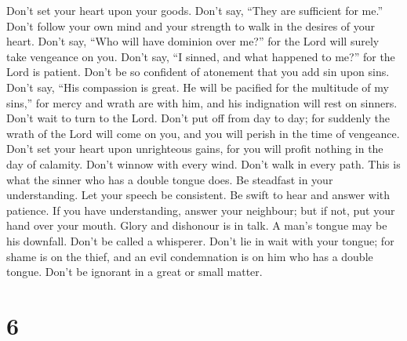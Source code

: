  Don't set your heart upon your goods. Don't say, ``They are
sufficient for me.''  Don't follow your own mind and your
strength to walk in the desires of your heart.  Don't say,
``Who will have dominion over me?'' for the Lord will surely take
vengeance on you.  Don't say, ``I sinned, and what happened
to me?'' for the Lord is patient.  Don't be so confident of
atonement that you add sin upon sins.  Don't say, ``His
compassion is great. He will be pacified for the multitude of my sins,''
for mercy and wrath are with him, and his indignation will rest on
sinners.  Don't wait to turn to the Lord. Don't put off from
day to day; for suddenly the wrath of the Lord will come on you, and you
will perish in the time of vengeance.  Don't set your heart
upon unrighteous gains, for you will profit nothing in the day of
calamity.  Don't winnow with every wind. Don't walk in every
path. This is what the sinner who has a double tongue does.
 Be steadfast in your understanding. Let your speech be
consistent.  Be swift to hear and answer with patience.
 If you have understanding, answer your neighbour; but if
not, put your hand over your mouth.  Glory and dishonour is
in talk. A man's tongue may be his downfall.  Don't be
called a whisperer. Don't lie in wait with your tongue; for shame is on
the thief, and an evil condemnation is on him who has a double tongue.
 Don't be ignorant in a great or small matter.

\hypertarget{section-2}{%
\section{6}\label{section-2}}

